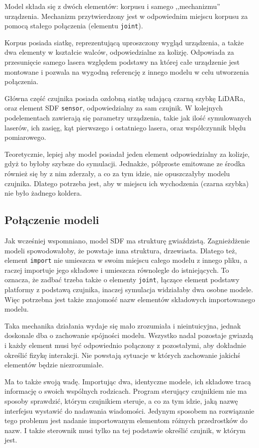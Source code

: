 	Model składa się z dwóch elementów: korpusu i samego ,,mechanizmu'' urządzenia.
	Mechanizm przytwierdzony jest w odpowiednim miejscu korpusu za pomocą stałego połączenia (elementu \texttt{joint}).

	Korpus posiada siatkę, reprezentującą uproszczony wygląd urządzenia, a także dwa elementy w kształcie walców, odpowiedzialne za kolizję.
	Odpowiada za przesunięcie samego lasera względem podstawy na której całe urządzenie jest montowane i pozwala na wygodną referencję z innego modelu w celu utworzenia połączenia.

	Główna część czujnika posiada ozdobną siatkę udającą czarną szybkę LiDARa, oraz element SDF \texttt{sensor}, odpowiedzialny za sam czujnik.
	W kolejnych podelementach zawierają się parametry urządzenia, takie jak ilość symulowanych laserów, ich zasięg, kąt pierwszego i ostatniego lasera, oraz współczynnik błędu pomiarowego.
	
	Teoretycznie, lepiej aby model posiadał jeden element odpowiedzialny za kolizje, gdyż to byłoby szybsze do symulacji. 
	Jednakże, półproste emitowane ze środka również się by z nim zderzały, a co za tym idzie, nie opuszczałyby modelu czujnika.
	Dlatego potrzeba jest, aby w miejscu ich wychodzenia (czarna szybka) nie było żadnego koldera.

	\subsection{Połączenie modeli}
		Jak wcześniej wspomniano,
		model SDF ma strukturę gwiaździstą. 
		Zagnieżdżenie modeli spowodowałoby, że powstaje inna struktura, drzewiasta.
		Dlatego też, element \texttt{import} nie umieszcza w swoim miejscu całego modelu z innego pliku, a raczej importuje jego składowe i umieszcza równolegle do istniejących.
		To oznacza, że zadbać trzeba także o elementy \texttt{joint}, łączące element podstawy platformy z podstawą czujnika, inaczej symulacja widziałaby dwa osobne modele.
		Więc potrzebna jest także znajomość nazw elementów składowych importowanego modelu.

		Taka mechanika działania wydaje się mało zrozumiała i nieintuicyjna, jednak doskonale dba o zachowanie spójności modelu.
		Wszystko nadal pozostaje gwiazdą i każdy element musi być odpowiednio połączony z pozostałymi, aby dokładnie określić fizykę interakcji.
		Nie powstają sytuacje w których zachowanie jakichś elementów będzie niezrozumiałe.

		Ma to także swoją wadę. Importując dwa, identyczne modele, ich składowe tracą informację o swoich wspólnych rodzicach.
		Program sterujący czujnikiem nie ma sposoby sprawdzić, którym czujnikiem steruje, a co za tym idzie, jaką nazwę interfejsu wystawić do nadawania wiadomości.
		Jedynym sposobem na rozwiązanie tego problemu jest nadanie importowanym elementom różnych przedrostków do nazw.
		I także sterownik musi tylko na tej podstawie określić czujnik, w którym jest.

